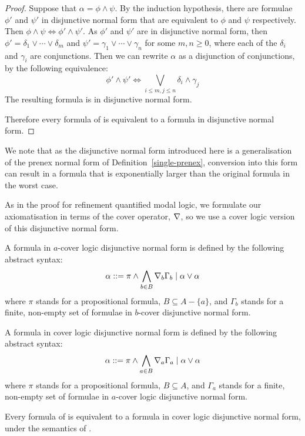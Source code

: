 \begin{proof}
Suppose that $\alpha = \phi \land \psi$. By the induction hypothesis, there are
formulae $\phi'$ and $\psi'$ in disjunctive normal form that are equivalent to
$\phi$ and $\psi$ respectively. Then $\phi \land \psi \iff \phi' \land \psi'$.
As $\phi'$ and $\psi'$ are in disjunctive normal form, then $\phi' = \delta_1
\lor \cdots \lor \delta_m$ and $\psi' = \gamma_1 \lor \cdots \lor \gamma_n$ for
some $m, n \geq 0$, where each of the $\delta_i$ and $\gamma_i$ are
conjunctions. Then we can rewrite $\alpha$ as a disjunction of conjunctions, by
the following equivalence:
$$
\phi' \land \psi' \iff \bigvee_{i \leq m, j \leq n} \delta_i \land \gamma_j
$$
The resulting formula is in disjunctive normal form.

Therefore every formula of \lang{} is equivalent to a formula in disjunctive
normal form.
\end{proof}

We note that as the disjunctive normal form introduced here is a generalisation
of the prenex normal form of Definition~\ref{single-prenex}, conversion into
this form can result in a formula that is exponentially larger than the original
formula in the worst case.

As in the proof for refinement quantified modal logic, we formulate our
axiomatisation in terms of the cover operator, $\nabla$, so we use a cover
logic version of this disjunctive normal form.

\begin{definition}
A formula in $a$-cover logic disjunctive normal form is defined by the following
abstract syntax:
$$
\alpha ::= \pi \land \bigwedge_{b \in B} \nabla_b \Gamma_b \mid
\alpha \lor \alpha
$$
where $\pi$ stands for a propositional formula, $B \subseteq A - \{a\}$, and
$\Gamma_b$ stands for a finite, non-empty set of formulae in $b$-cover
disjunctive normal form.

A formula in cover logic disjunctive normal form is defined by the following
abstract syntax:
$$
\alpha ::= \pi \land \bigwedge_{a \in B} \nabla_a \Gamma_a \mid
\alpha \lor \alpha
$$
where $\pi$ stands for a propositional formula, $B \subseteq A$, and $\Gamma_a$
stands for a finite, non-empty set of formulae in $a$-cover logic disjunctive normal
form.
\end{definition}

\begin{lemma}
Every formula of \lang{} is equivalent to a formula in cover logic disjunctive normal
form, under the semantics of \logicKD{}.
\end{lemma}

